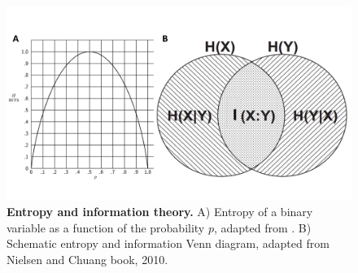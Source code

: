 \begin{figure}
    \centering
    \includegraphics[width=\textwidth]{Figures/Chapter1/intro_fig_info.pdf}
    \caption[Entropy and information theory]{\textbf{Entropy and information theory.} 
    A) Entropy of a binary variable as a function of the probability $p$, adapted from \cite{shannon1948}. 
    B) Schematic entropy and information Venn diagram, adapted from Nielsen and Chuang book, 2010.}
    \label{fig:chap1:info_theory_concepts}
\end{figure}

